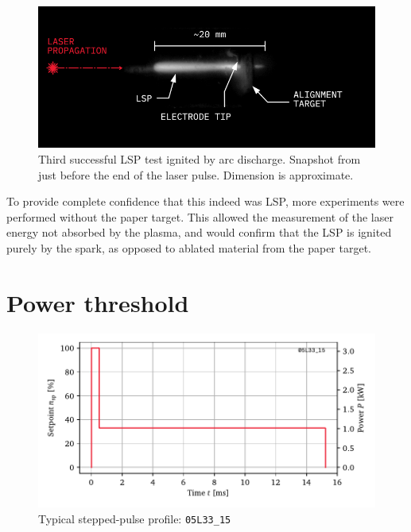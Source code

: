         \begin{figure}[h]
            \centering
            \includegraphics[]{assets/3 design/LSP3_annotated.jpg}
            \caption[Third successful LSP test ignited by arc discharge]{Third successful LSP test ignited by arc discharge. Snapshot from just before the end of the laser pulse. Dimension is approximate.}
            \label{fig:lsp3}
        \end{figure}

        To provide complete confidence that this indeed was LSP, more experiments were performed without the paper target. This allowed the measurement of the laser energy not absorbed by the plasma, and would confirm that the LSP is ignited purely by the spark, as opposed to ablated material from the paper target. 

    \section{Power threshold}
    
    

    

    \begin{figure}[h]
        \centering
        \includegraphics[]{assets/5 results/pulse_profile}
        \caption{Typical stepped-pulse profile: \texttt{05L33\_15}}
        \label{fig:pulse_stepProfile}
    \end{figure}


